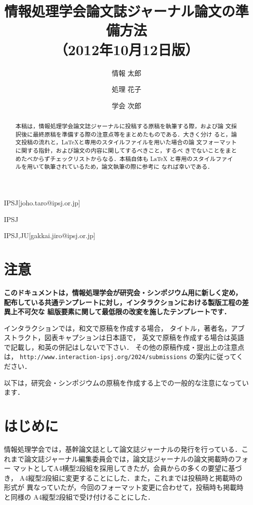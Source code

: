 \documentclass[submit,techrep,noauthor]{ipsj}
\begin{document}
\title{情報処理学会論文誌ジャーナル論文の準備方法\\
    （2012年10月12日版）}



\author{情報 太郎}{}{IPSJ}[joho.taro@ipsj.or.jp]
\author{処理 花子}{}{IPSJ}
\author{学会 次郎}{}{IPSJ,JU}[gakkai.jiro@ipsj.or.jp]

\begin{abstract}
    本稿は，情報処理学会論文誌ジャーナルに投稿する原稿を執筆する際，および論
    文採択後に最終原稿を準備する際の注意点等をまとめたものである．大きく分け
    ると，論文投稿の流れと，\LaTeX と専用のスタイルファイルを用いた場合の論
    文フォーマットに関する指針，および論文の内容に関してするべきこと，するべ
    きでないことをまとめたべからずチェックリストからなる．本稿自体も \LaTeX
    と専用のスタイルファイルを用いて執筆されているため，論文執筆の際に参考に
    なれば幸いである．
\end{abstract}

\maketitle

\section{注意}

 {\bf
  このドキュメントは，情報処理学会が研究会・シンポジウム用に新しく定め，
  配布している共通テンプレートに対し，インタラクションにおける製版工程の差異上不可欠な
  組版要素に関して最低限の改変を施したテンプレートです．

  インタラクションでは，和文で原稿を作成する場合，
  タイトル，著者名，アブストラクト，図表キャプションは日本語で，
  英文で原稿を作成する場合は英語で記載し，和英の併記はしないで下さい．
  その他の原稿作成・提出上の注意点は，
  \texttt{http://www.interaction-ipsj.org/2024/submissions} の案内に従ってください．

  以下は，研究会・シンポジウムの原稿を作成する上での一般的な注意になっています．
 }

\section{はじめに}

情報処理学会では，基幹論文誌として論文誌ジャーナルの発行を行っている．こ
れまで論文誌ジャーナル編集委員会では，論文誌ジャーナルの論文掲載時のフォー
マットとしてA4横型2段組を採用してきたが，会員からの多くの要望に基づき，
A4縦型2段組に変更することにした．また，これまでは投稿時と掲載時の形式が
異なっていたが，今回のフォーマット変更に合わせて，投稿時も掲載時と同様の
A4縦型2段組で受け付けることにした．
\end{document}
